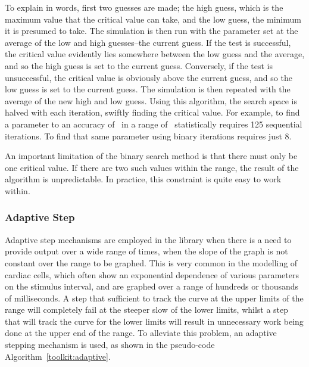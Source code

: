 To explain in words, first two guesses are made; the high guess, which is the
maximum value that the critical value can take, and the low guess, the minimum
it is presumed to take.  The simulation is then run with the parameter set at
the average of the low and high guesses--the current guess.  If the test is
successful, the critical value evidently lies somewhere between the low guess
and the average, and so the high guess is set to the current guess.  Conversely,
if the test is unsuccessful, the critical value is obviously above the current
guess, and so the low guess is set to the current guess.  The simulation is then
repeated with the average of the new high and low guess.  Using this algorithm,
the search space is halved with each iteration, swiftly finding the critical
value.
For example, to find a parameter to an accuracy of \ in a range of
\ statistically requires 125 sequential iterations.
To find that same parameter using binary iterations requires just 8.

An important limitation of the binary search method is that there must only be
one critical value.
If there are two such values within the range, the result of the algorithm is
unpredictable.
In practice, this constraint is quite easy to work within.

\subsubsection{Adaptive Step}

Adaptive step mechanisms are employed in the library when there is a need to
provide output over a wide range of times, when the slope of the graph is not
constant over the range to be graphed.  This is very common in the modelling of
cardiac cells, which often show an exponential dependence of various parameters
on the  stimulus interval, and are graphed over a range of hundreds or thousands
of milliseconds.  A step that sufficient to track the curve at the upper limits
of the range will completely fail at the steeper slow of the lower limits,
whilst a step that will track the curve for the lower limits will result in
unnecessary work being done at the upper end of the range.  To alleviate this
problem, an adaptive stepping mechanism is used, as shown in the pseudo-code
Algorithm~\ref{toolkit:adaptive}.

